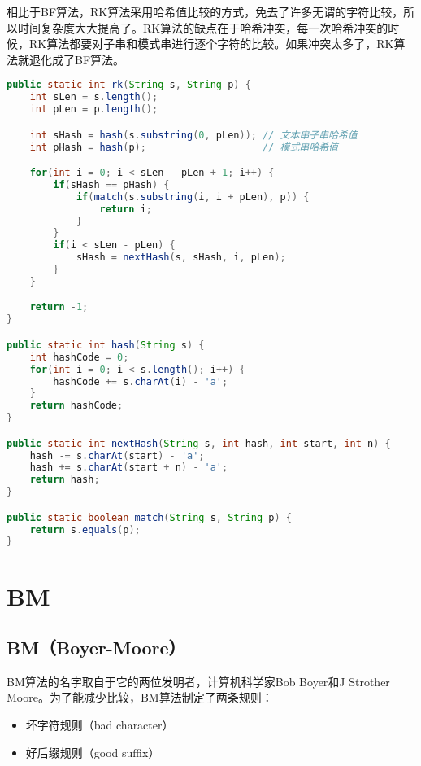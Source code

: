 相比于BF算法，RK算法采用哈希值比较的方式，免去了许多无谓的字符比较，所以时间复杂度大大提高了。RK算法的缺点在于哈希冲突，每一次哈希冲突的时候，RK算法都要对子串和模式串进行逐个字符的比较。如果冲突太多了，RK算法就退化成了BF算法。\\


\begin{lstlisting}[language=Java]
public static int rk(String s, String p) {
    int sLen = s.length();
    int pLen = p.length();

    int sHash = hash(s.substring(0, pLen)); // 文本串子串哈希值
    int pHash = hash(p);                    // 模式串哈希值

    for(int i = 0; i < sLen - pLen + 1; i++) {
        if(sHash == pHash) {
            if(match(s.substring(i, i + pLen), p)) {
                return i;
            }
        }
        if(i < sLen - pLen) {
            sHash = nextHash(s, sHash, i, pLen);
        }
    }

    return -1;
}

public static int hash(String s) {
    int hashCode = 0;
    for(int i = 0; i < s.length(); i++) {
        hashCode += s.charAt(i) - 'a';
    }
    return hashCode;
}

public static int nextHash(String s, int hash, int start, int n) {
    hash -= s.charAt(start) - 'a';
    hash += s.charAt(start + n) - 'a';
    return hash;
}

public static boolean match(String s, String p) {
    return s.equals(p);
}
\end{lstlisting}

\newpage

\section{BM}

\subsection{BM（Boyer-Moore）}

BM算法的名字取自于它的两位发明者，计算机科学家Bob Boyer和J Strother Moore。为了能减少比较，BM算法制定了两条规则：

\begin{itemize}
	\item 坏字符规则（bad character）
	\item 好后缀规则（good suffix）
\end{itemize}

